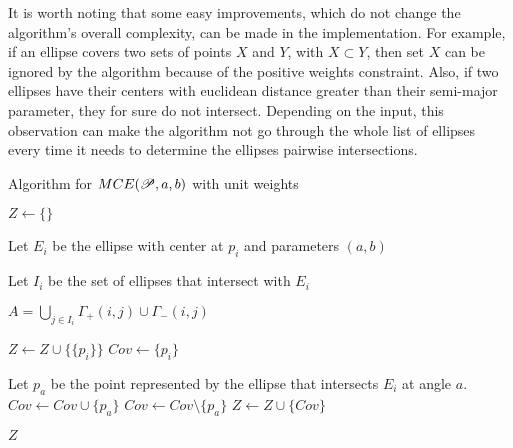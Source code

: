 It is worth noting that some easy improvements, which do not change the algorithm's overall complexity, can be made in the implementation. For example, if an ellipse covers two sets of points $X$ and $Y$, with $X \subset Y$, then set $X$ can be ignored by the algorithm because of the positive weights constraint. Also, if two ellipses have their centers with euclidean distance greater than their semi-major parameter, they for sure do not intersect. Depending on the input, this observation can make the algorithm not go through the whole list of ellipses every time it needs to determine the ellipses pairwise intersections.

\renewcommand{\algorithmicrequire}{\textbf{Input:}}
\renewcommand{\algorithmicensure}{\textbf{Output:}}

\begin{algoritmo}[H]
\caption{Algorithm for $MCE(\mathscr{P}, a, b)$ with unit weights}\label{algoritmo:mce1}

\begin{algorithmic}[1]
\State $Z \gets \{\}$ 

\State Let $E_i$ be the ellipse with center at $p_i$ and parameters $(a,b)$

\State Let $I_i$ be the set of ellipses that intersect with $E_i$

\State $A = \bigcup_{j \in I_i} \Gamma_+(i,j) \cup \Gamma_-(i,j)$

\State $Z \gets Z \cup \{\{p_i\}\}$
\State $Cov \gets \{p_i\}$ 

 
\State Let $p_a$ be the point represented by the ellipse that intersects $E_i$ at angle $a$. 
\State $Cov \gets Cov \cup \{p_a\}$
\Else
\State $Cov \gets Cov \setminus \{p_a\}$
\EndIf
\State $Z \gets Z \cup \{Cov\}$
\EndFor
\EndFor
\EndFor

\State \Return $Z$
\EndProcedure


\end{algorithmic}
\end{algoritmo}

